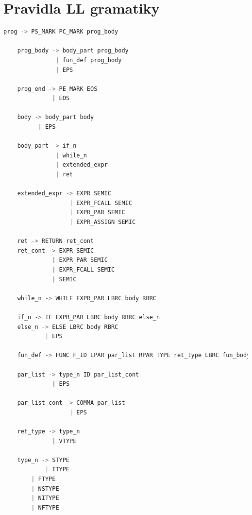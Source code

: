 \documentclass[a4paper, 11pt]{article}
\begin{document}
	\section*{Pravidla LL gramatiky}
	\label{gram}
	\endgroup
	\begin{lstlisting}[language=Python]
	prog -> PS_MARK PC_MARK prog_body

	prog_body -> body_part prog_body
	           | fun_def prog_body
	           | EPS
	
	prog_end -> PE_MARK EOS
	          | EOS
	
	body -> body_part body
	      | EPS
	
	body_part -> if_n
	           | while_n
	           | extended_expr
	           | ret
	
	extended_expr -> EXPR SEMIC 
	               | EXPR_FCALL SEMIC
	               | EXPR_PAR SEMIC
	               | EXPR_ASSIGN SEMIC
	
	ret -> RETURN ret_cont
	ret_cont -> EXPR SEMIC
	          | EXPR_PAR SEMIC
	          | EXPR_FCALL SEMIC
	          | SEMIC
	
	while_n -> WHILE EXPR_PAR LBRC body RBRC
	
	if_n -> IF EXPR_PAR LBRC body RBRC else_n
	else_n -> ELSE LBRC body RBRC
	        | EPS
		  
	fun_def -> FUNC F_ID LPAR par_list RPAR TYPE ret_type LBRC fun_body RBRC
	
	par_list -> type_n ID par_list_cont
	          | EPS
	
	par_list_cont -> COMMA par_list
	               | EPS
				
	ret_type -> type_n
	          | VTYPE
	
	type_n -> STYPE
	        | ITYPE
		| FTYPE
		| NSTYPE
		| NITYPE
		| NFTYPE

	\end{lstlisting}

\end{document}
